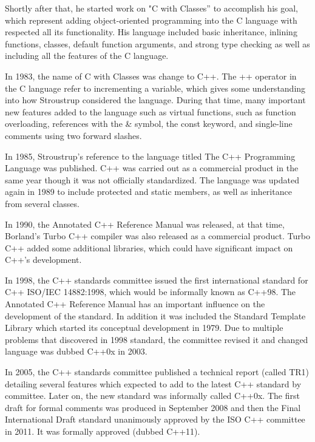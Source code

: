 \documentclass[11pt]{report}
\begin{document}
Shortly after that, he started work on "C with Classes” to accomplish his goal, which represent adding object-oriented programming into the C language with respected all its functionality. His language included basic inheritance, inlining functions, classes, default function arguments, and strong type checking as well as including all the features of the C language\cite{StroustrupHistory}.

In 1983, the name of C with Classes was change to C++. \linebreak The ++ operator in the C language refer to incrementing a variable, which gives some understanding into how Stroustrup considered the language.  \linebreak During that time, many important new features added to the language such as  virtual functions, such as function overloading, references with the \& symbol, the const keyword, and single-line comments using two forward slashes\cite{StroustrupHistory}.

In 1985, Stroustrup's reference to the language titled The C++ \linebreak Programming Language was published. C++ was carried out as a \linebreak commercial product in the same year though it was not officially \linebreak standardized. The language was updated again in 1989 to include protected and static members, as well as inheritance from several classes\cite{StroustrupHistory}.

In 1990, the Annotated C++ Reference Manual was released, at that time, Borland's Turbo C++ compiler was also released as a commercial product. Turbo C++ added some additional libraries, which could have significant \linebreak impact on C++'s development\cite{StroustrupHistory}.

In 1998, the C++ standards committee issued the first international \linebreak standard for C++ ISO/IEC 14882:1998, which would be informally known as C++98. The Annotated C++ Reference Manual has an important influence on the development of the standard.  In addition it was included the Standard Template Library which started its conceptual development in 1979. Due to multiple problems that discovered in 1998 standard, the committee revised it and changed language was dubbed C++0x in 2003\cite{CplusplusHistoryofCpp}.

In 2005, the C++ standards committee published a technical report (called TR1) detailing several features which expected to add to the latest C++ \linebreak standard by committee. Later on, the new standard was informally called C++0x.  The first draft for formal comments was produced in September 2008 and then the Final International Draft standard unanimously approved by the ISO C++ committee in 2011. It was formally approved (dubbed C++11)\cite{CplusplusHistoryofCpp}.
\end{document}
